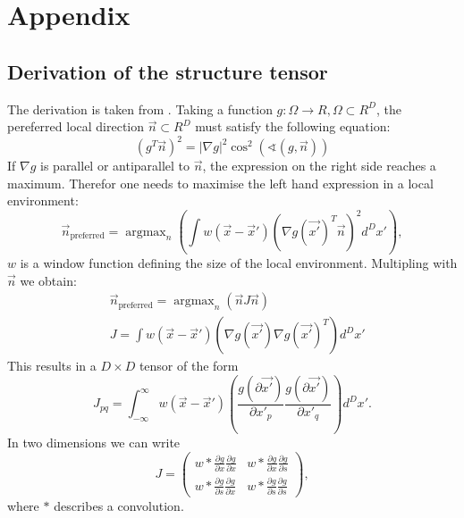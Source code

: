 \documentclass  [
  paper    = a4,
  BCOR     = 10mm,
  twoside,
  fontsize = 12pt,
  fleqn,
  toc      = bibnumbered,
  toc      = listofnumbered,
  numbers  = noendperiod,
  headings = normal,
  listof   = leveldown,
  version  = 3.03
]                                       {scrreprt}
\DeclareMathOperator*{\argmax}{argmax}
\begin{document}
  \part*{Appendix}
  \begin{appendix}
  	\chapter{Derivation of the structure tensor}
  	The derivation is taken from \cite{jahne2013digitale}. Taking a function $g:\Omega\rightarrow \!R, \Omega \subset \!R^D$, the pereferred local direction $\vec{n} \subset \!R^D$ must satisfy the following equation:
  	\begin{equation}\label{key}
  	( g^T\vec{n})^2 = |\nabla g |^2 \cos^2(\sphericalangle (g, \vec{n}))
  	\end{equation}
  	If $\nabla g$ is parallel or antiparallel to $\vec{n}$, the expression on the right side reaches a maximum. Therefor one needs to maximise the left hand expression in a local environment:
  	\begin{equation}\label{key}
  	\vec n_\text{preferred} = \argmax_n\left(\int w(\vec x - \vec x')\left(\nabla g(\vec{x'})^T \vec{n}\right)^2d^Dx' \right),
  	\end{equation}
  	$w$ is a window function defining the size of the local environment. Multipling with $\vec{n}$
  	we obtain:
  	\begin{align}\label{key}
  	&\vec n_\text{preferred} = \argmax_n\left(\vec n  J \vec n \right)\\
  	& J = \int w(\vec x - \vec x')\left(\nabla g(\vec{x'}) \nabla g(\vec{x'})^T\right)d^Dx'
  	\end{align}
  	This results in a $D\times D $ tensor of the form
  	\begin{equation}\label{key}
  	J_{pq} = \int_{-\infty}^{\infty} w(\vec x - \vec x')\left(\frac{g(\partial\vec{x'})}{\partial x'_p} \frac{g(\partial\vec{x'})}{\partial x'_q}\right)d^Dx'.
  	\end{equation}
  	In two dimensions we can write
	\begin{equation}\label{key}
	J =\left(
	\begin{matrix}
	w*\frac{\partial g}{\partial x}\frac{\partial g}{\partial x} & w*\frac{\partial g}{\partial x}\frac{\partial g}{\partial s} \\
	w*\frac{\partial g}{\partial s}\frac{\partial g}{\partial x} & w*\frac{\partial g}{\partial s}\frac{\partial g}{\partial s} 
	\end{matrix}\right),
	\end{equation}  
	where \glqq $*$ \grqq describes a convolution.	
  	

\end{appendix}
\end{document}
